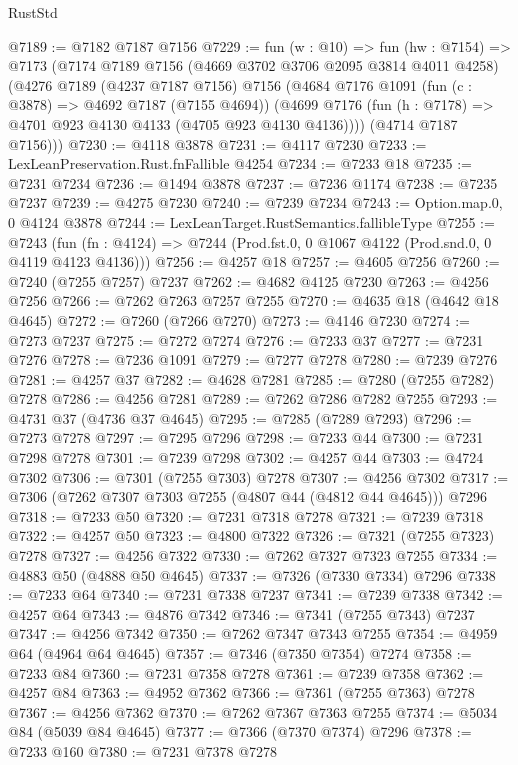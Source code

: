 \begin{lexlean}{RustStd}
\begin{coremodule}
@7189 := @7182 @7187 @7156
@7229 := fun (w : @10) =>
  fun (hw : @7154) =>
  @7173
    (@7174
      @7189
      @7156
      (@4669 @3702 @3706 @2095 @3814 @4011 @4258)
      (@4276
        @7189
        (@4237 @7187 @7156)
        @7156
        (@4684
          @7176
          @1091
          (fun (c : @3878) => @4692 @7187 (@7155 @4694))
          (@4699 @7176 (fun (h : @7178) => @4701 @923 @4130 @4133 (@4705 @923 @4130 @4136))))
        (@4714 @7187 @7156)))
@7230 := @4118 @3878
@7231 := @4117 @7230
@7233 := LexLeanPreservation.Rust.fnFallible @4254
@7234 := @7233 @18
@7235 := @7231 @7234
@7236 := @1494 @3878
@7237 := @7236 @1174
@7238 := @7235 @7237
@7239 := @4275 @7230
@7240 := @7239 @7234
@7243 := Option.map.{0, 0} @4124 @3878
@7244 := LexLeanTarget.RustSemantics.fallibleType
@7255 := @7243
    (fun (fn : @4124) => @7244 (Prod.fst.{0, 0} @1067 @4122 (Prod.snd.{0, 0} @4119 @4123 @4136)))
@7256 := @4257 @18
@7257 := @4605 @7256
@7260 := @7240 (@7255 @7257) @7237
@7262 := @4682 @4125 @7230
@7263 := @4256 @7256
@7266 := @7262 @7263 @7257 @7255
@7270 := @4635 @18 (@4642 @18 @4645)
@7272 := @7260 (@7266 @7270)
@7273 := @4146 @7230
@7274 := @7273 @7237
@7275 := @7272 @7274
@7276 := @7233 @37
@7277 := @7231 @7276
@7278 := @7236 @1091
@7279 := @7277 @7278
@7280 := @7239 @7276
@7281 := @4257 @37
@7282 := @4628 @7281
@7285 := @7280 (@7255 @7282) @7278
@7286 := @4256 @7281
@7289 := @7262 @7286 @7282 @7255
@7293 := @4731 @37 (@4736 @37 @4645)
@7295 := @7285 (@7289 @7293)
@7296 := @7273 @7278
@7297 := @7295 @7296
@7298 := @7233 @44
@7300 := @7231 @7298 @7278
@7301 := @7239 @7298
@7302 := @4257 @44
@7303 := @4724 @7302
@7306 := @7301 (@7255 @7303) @7278
@7307 := @4256 @7302
@7317 := @7306 (@7262 @7307 @7303 @7255 (@4807 @44 (@4812 @44 @4645))) @7296
@7318 := @7233 @50
@7320 := @7231 @7318 @7278
@7321 := @7239 @7318
@7322 := @4257 @50
@7323 := @4800 @7322
@7326 := @7321 (@7255 @7323) @7278
@7327 := @4256 @7322
@7330 := @7262 @7327 @7323 @7255
@7334 := @4883 @50 (@4888 @50 @4645)
@7337 := @7326 (@7330 @7334) @7296
@7338 := @7233 @64
@7340 := @7231 @7338 @7237
@7341 := @7239 @7338
@7342 := @4257 @64
@7343 := @4876 @7342
@7346 := @7341 (@7255 @7343) @7237
@7347 := @4256 @7342
@7350 := @7262 @7347 @7343 @7255
@7354 := @4959 @64 (@4964 @64 @4645)
@7357 := @7346 (@7350 @7354) @7274
@7358 := @7233 @84
@7360 := @7231 @7358 @7278
@7361 := @7239 @7358
@7362 := @4257 @84
@7363 := @4952 @7362
@7366 := @7361 (@7255 @7363) @7278
@7367 := @4256 @7362
@7370 := @7262 @7367 @7363 @7255
@7374 := @5034 @84 (@5039 @84 @4645)
@7377 := @7366 (@7370 @7374) @7296
@7378 := @7233 @160
@7380 := @7231 @7378 @7278

\end{coremodule}
\end{lexlean}
